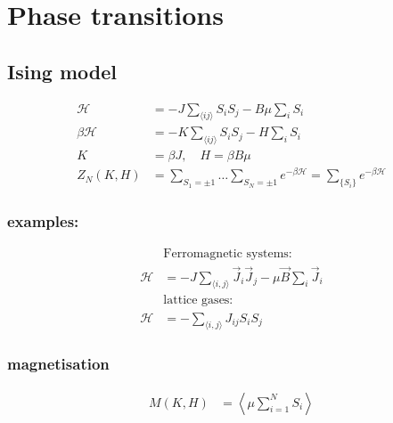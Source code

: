 \section{Phase transitions}

\subsection*{Ising model}
\begin{equation*}
    \begin{aligned}
        \mathcal{H} &= -J \sum_{\langle ij \rangle} S_i S_j - B \mu \sum_i S_i \\
        \beta \mathcal{H} &= - K \sum_{\langle i j \rangle} S_i S_j - H \sum_i S_i \\
        K &= \beta J, \quad H = \beta B \mu\\
        Z_N(K,H) &= \sum_{S_1 = \pm 1} \dots \sum_{S_N = \pm 1} e^{-\beta \mathcal{H}} = \sum_{\lbrace S_i \rbrace} e^{-\beta \mathcal{H}}
    \end{aligned}
\end{equation*}

\subsubsection*{examples:}
\begin{equation*}
    \begin{aligned}
        &\text{Ferromagnetic systems:}\\
        \mathcal{H} &= -J \sum_{\langle i,j \rangle} \vec{J}_i \vec{J}_j - \mu \vec{B}\sum_i \vec{J}_i \\
        &\text{lattice gases:} \\
        \mathcal{H} &= -\sum_{\langle i,j \rangle} J_{ij} S_i S_j
    \end{aligned}
\end{equation*}

\subsubsection*{magnetisation}
\begin{equation*}
    \begin{aligned}
        M(K,H) &= \left\langle \mu \sum_{i=1}^{N} S_i \right\rangle
    \end{aligned}
\end{equation*}

